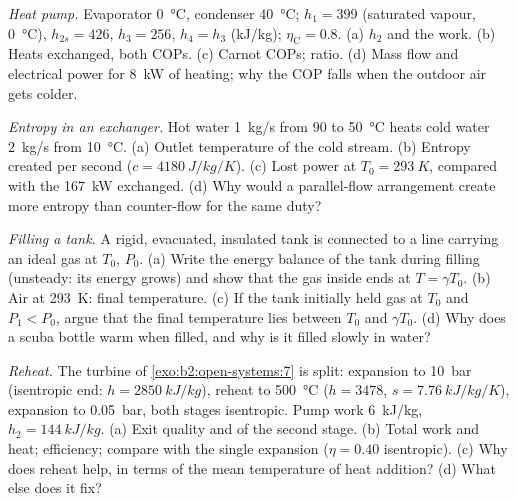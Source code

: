 \begin{exercise}[$\star\star$]\label{exo:b2:open-systems:8}
\emph{Heat pump.} Evaporator \qty{0}{\celsius}, condenser \qty{40}{\celsius};
$h_1 = 399$ (saturated vapour, \qty{0}{\celsius}), $h_{2s} = 426$, $h_3 = 256$,
$h_4 = h_3$ (\unit{kJ/kg}); $\eta_{\text{C}} = 0.8$. (a) $h_2$ and the work.
(b) Heats exchanged, both COPs. (c) Carnot COPs; ratio. (d) Mass flow
and electrical power for \qty{8}{kW} of heating; why the COP falls when
the outdoor air gets colder.
\end{exercise}

\begin{exercise}[$\star\star$]\label{exo:b2:open-systems:9}
\emph{Entropy in an exchanger.} Hot water \qty{1}{kg/s} from \qty{90}{} to
\qty{50}{\celsius} heats cold water \qty{2}{kg/s} from \qty{10}{\celsius}.
(a) Outlet temperature of the cold stream. (b) Entropy created per
second ($c = \qty{4180}{J/kg/K}$). (c) Lost power at $T_0 = \qty{293}{K}$,
compared with the \qty{167}{kW} exchanged. (d) Why would a parallel-flow
arrangement create more entropy than counter-flow for the same duty?
\end{exercise}

\begin{exercise}[$\star\star\star$]\label{exo:b2:open-systems:10}
\emph{Filling a tank.} A rigid, evacuated, insulated tank is connected
to a line carrying an ideal gas at $T_0$, $P_0$. (a) Write the energy
balance of the tank during filling (unsteady: its energy grows) and
show that the gas inside ends at $T = \gamma T_0$. (b) Air at \qty{293}{K}:
final temperature. (c) If the tank initially held gas at $T_0$ and
$P_1 < P_0$, argue that the final temperature lies between $T_0$ and
$\gamma T_0$. (d) Why does a scuba bottle warm when filled, and why is
it filled slowly in water?
\end{exercise}

\begin{exercise}[$\star\star\star$]\label{exo:b2:open-systems:11}
\emph{Reheat.} The turbine of \cref{exo:b2:open-systems:7} is split:
expansion to \qty{10}{bar} (isentropic end: $h = \qty{2850}{kJ/kg}$), reheat
to \qty{500}{\celsius} ($h = 3478$, $s = \qty{7.76}{kJ/kg/K}$), expansion to
\qty{0.05}{bar}, both stages isentropic. Pump work \qty{6}{kJ/kg}, $h_2 =
\qty{144}{kJ/kg}$. (a) Exit quality and  of the second stage. (b)
Total work and heat; efficiency; compare with the single expansion
($\eta = 0.40$ isentropic). (c) Why does reheat help, in terms of the
mean temperature of heat addition? (d) What else does it fix?
\end{exercise}

